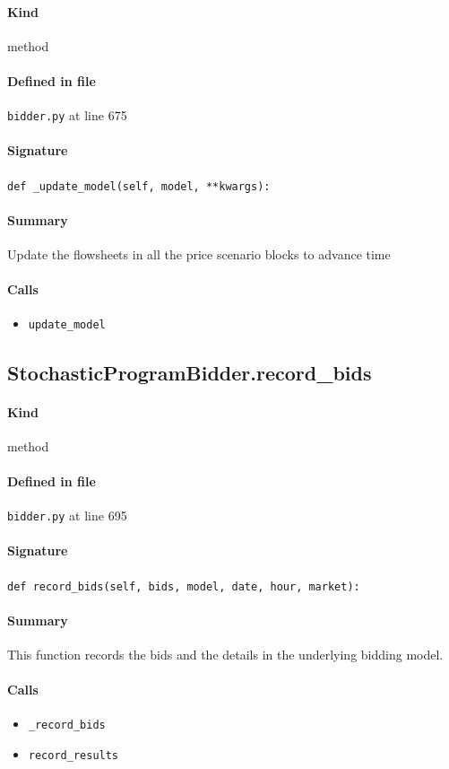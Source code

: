 \documentclass[11pt]{report}
\begin{document}
\paragraph{Kind} method
\paragraph{Defined in file} \texttt{bidder.py} at line 675
\paragraph{Signature} \texttt{def \_update\_model(self, model, **kwargs):}
\paragraph{Summary} Update the flowsheets in all the price scenario blocks to advance time
\paragraph{Calls}
\begin{itemize}[leftmargin=*]
  \item \texttt{update\_model}
\end{itemize}
\subsection{StochasticProgramBidder.record\_bids}
\label{def:bidder.py:StochasticProgramBidder.record_bids:L695}
\paragraph{Kind} method
\paragraph{Defined in file} \texttt{bidder.py} at line 695
\paragraph{Signature} \texttt{def record\_bids(self, bids, model, date, hour, market):}
\paragraph{Summary} This function records the bids and the details in the underlying bidding model.
\paragraph{Calls}
\begin{itemize}[leftmargin=*]
  \item \texttt{\_record\_bids}
  \item \texttt{record\_results}
\end{itemize}
\end{document}
